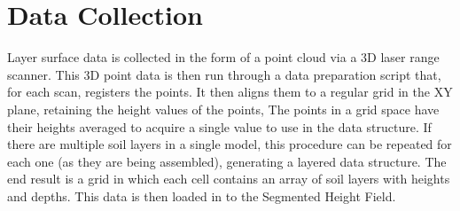 % 
% 
% 


\section{Data Collection}

Layer surface data is collected in the form of a point cloud via a 3D laser range scanner. This 3D point data is then run through a data preparation script that, for each scan, registers the points. It then aligns them to a regular grid in the XY plane, retaining the height values of the points, The points in a grid space have their heights averaged to acquire a single value to use in the data structure. If there are multiple soil layers in a single model, this procedure can be repeated for each one (as they are being assembled), generating a layered data structure. The end result is a grid in which each cell contains an array of soil layers with heights and depths. This data is then loaded in to the Segmented Height Field.

